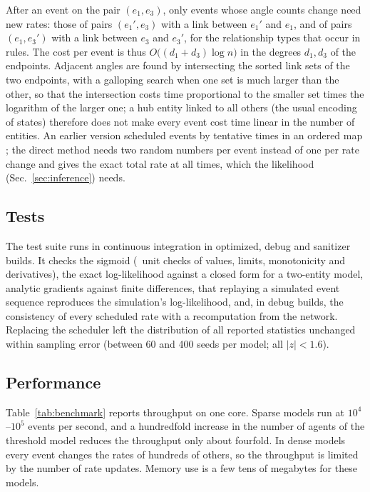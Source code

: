 After an event on the pair $(e_1, e_3)$, only events whose angle counts change need new rates: those of pairs $(e_1', e_3)$ with a link between $e_1'$ and $e_1$, and of pairs $(e_1, e_3')$ with a link between $e_3$ and $e_3'$, for the relationship types that occur in rules.
The cost per event is thus $O\bigl((d_1 + d_3) \log n\bigr)$ in the degrees $d_1, d_3$ of the endpoints.
Adjacent angles are found by intersecting the sorted link sets of the two endpoints, with a galloping search when one set is much larger than the other, so that the intersection costs time proportional to the smaller set times the logarithm of the larger one; a hub entity linked to all others (the usual encoding of states) therefore does not make every event cost time linear in the number of entities.
An earlier version scheduled events by tentative times in an ordered map \citep{gibson2000}; the direct method needs two random numbers per event instead of one per rate change and gives the exact total rate at all times, which the likelihood (Sec.~\ref{sec:inference}) needs.

\subsection{Tests}
The test suite runs in continuous integration in optimized, debug and sanitizer builds.
It checks the sigmoid (\TestSigmoidChecks\ unit checks of values, limits, monotonicity and derivatives), the exact log-likelihood against a closed form for a two-entity model, analytic gradients against finite differences, that replaying a simulated event sequence reproduces the simulation's log-likelihood, and, in debug builds, the consistency of every scheduled rate with a recomputation from the network.
Replacing the scheduler left the distribution of all reported statistics unchanged within sampling error (between 60 and 400 seeds per model; all $|z| < 1.6$).

\subsection{Performance}
Table~\ref{tab:benchmark} reports throughput on one core.
Sparse models run at $10^4$--$10^5$ events per second, and a hundredfold increase in the number of agents of the threshold model reduces the throughput only about fourfold.
In dense models every event changes the rates of hundreds of others, so the throughput is limited by the number of rate updates.
Memory use is a few tens of megabytes for these models.

\begin{table}[t]
\caption{Throughput of \tricl\ on one core of a cloud virtual machine (best of three runs of $2\times 10^4$ events, initialization excluded).
Helfmann: threshold model of Fig.~\ref{fig:frames} with mean degree 10; 3-blocks: the triadic-closure model of Sec.~\ref{sec:model}, mean degree about 100; SIR: epidemic with social distancing on a random geometric graph.}
\label{tab:benchmark}

\end{table}
